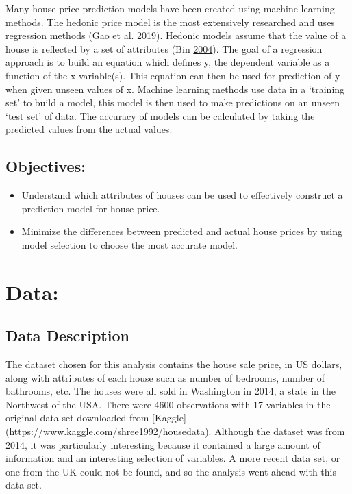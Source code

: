 \documentclass[
]{article}
\providecommand{\tightlist}{%
  \setlength{\itemsep}{0pt}\setlength{\parskip}{0pt}}
\begin{document}
Many house price prediction models have been created using machine
learning methods. The hedonic price model is the most extensively
researched and uses regression methods (Gao et al.
\protect\hyperlink{ref-gao2019location}{2019}). Hedonic models assume
that the value of a house is reflected by a set of attributes (Bin
\protect\hyperlink{ref-bin2004prediction}{2004}). The goal of a
regression approach is to build an equation which defines y, the
dependent variable as a function of the x variable(s). This equation can
then be used for prediction of y when given unseen values of x. Machine
learning methods use data in a `training set' to build a model, this
model is then used to make predictions on an unseen `test set' of data.
The accuracy of models can be calculated by taking the predicted values
from the actual values.

\hypertarget{objectives}{%
\subsection{Objectives:}\label{objectives}}

\begin{itemize}
\tightlist
\item
  Understand which attributes of houses can be used to effectively
  construct a prediction model for house price.
\item
  Minimize the differences between predicted and actual house prices by
  using model selection to choose the most accurate model.
\end{itemize}

\hypertarget{data}{%
\section{Data:}\label{data}}

\hypertarget{data-description}{%
\subsection{Data Description}\label{data-description}}

The dataset chosen for this analysis contains the house sale price, in
US dollars, along with attributes of each house such as number of
bedrooms, number of bathrooms, etc. The houses were all sold in
Washington in 2014, a state in the Northwest of the USA. There were 4600
observations with 17 variables in the original data set downloaded from
{[}Kaggle{]} (\url{https://www.kaggle.com/shree1992/housedata}).
Although the dataset was from 2014, it was particularly interesting
because it contained a large amount of information and an interesting
selection of variables. A more recent data set, or one from the UK could
not be found, and so the analysis went ahead with this data set.
\end{document}
